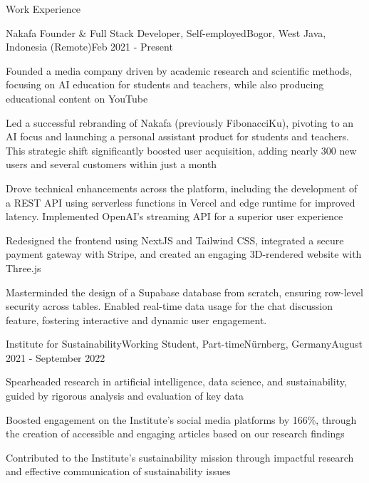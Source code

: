 \documentclass{article}
\newlength{\tabin}
\newlength{\secsep}
\newcommand{\lineunder}{\vspace*{-6pt} \\ \hspace*{-6pt} \hrulefill \\ \vspace*{-15pt}}
\newenvironment{tabbedsection}[1]{
  \begin{list}{}{
      \setlength{\itemsep}{0pt}
      \setlength{\labelsep}{0pt}
      \setlength{\labelwidth}{0pt}
      \setlength{\leftmargin}{\tabin}
      \setlength{\rightmargin}{\tabin}
      \setlength{\listparindent}{0pt}
      \setlength{\parsep}{0pt}
      \setlength{\parskip}{0pt}
      \setlength{\partopsep}{0pt}
      \setlength{\topsep}{#1}
    }
  \item[]
}{\end{list}}
\newenvironment{resume_section}[1]{
  \vspace{1.5\secsep}
  \textsc{\large#1}
  \lineunder
  \begin{tabbedsection}{\secsep}
}{\end{tabbedsection}}
\newenvironment{subitems}{
  \renewcommand{\labelitemi}{-}
  \begin{itemize}
      \setlength{\labelsep}{1em}
}{\end{itemize}}
\newenvironment{resume_employer}[4]{
  \vspace{\secsep}
  \textbf{#1} \\ 
  \indent {\small #2} \hfill {\footnotesize#3 (#4)}
  \begin{tabbedsection}{0pt}
  \begin{subitems}
}{\end{subitems}\end{tabbedsection}}
\begin{document}
\begin{resume_section}{Work Experience}
      \begin{resume_employer}{Nakafa \href{https://www.fibonacciku.com}{}}{Founder \& Full Stack Developer, Self-employed}{Bogor, West Java, Indonesia (Remote)}{Feb 2021 - Present}
        \item Founded a media company driven by academic research and scientific methods, focusing on AI education for students and teachers, while also producing educational content on YouTube
        \item Led a successful rebranding of Nakafa (previously FibonacciKu), pivoting to an AI focus and launching a personal assistant product for students and teachers. This strategic shift significantly boosted user acquisition, adding nearly 300 new users and several customers within just a month
        \item Drove technical enhancements across the platform, including the development of a REST API using serverless functions in Vercel and edge runtime for improved latency. Implemented OpenAI's streaming API for a superior user experience
        \item Redesigned the frontend using NextJS and Tailwind CSS, integrated a secure payment gateway with Stripe, and created an engaging 3D-rendered website with Three.js
        \item Masterminded the design of a Supabase database from scratch, ensuring row-level security across tables. Enabled real-time data usage for the chat discussion feature, fostering interactive and dynamic user engagement.
      \end{resume_employer}

      \begin{resume_employer}{Institute for Sustainability}{Working Student, Part-time}{Nürnberg, Germany}{August 2021 - September 2022}
        \item Spearheaded research in artificial intelligence, data science, and sustainability, guided by rigorous analysis and evaluation of key data
        \item Boosted engagement on the Institute's social media platforms by 166\%, through the creation of accessible and engaging articles based on our research findings
        \item Contributed to the Institute's sustainability mission through impactful research and effective communication of sustainability issues
      \end{resume_employer}
    \end{resume_section}
\end{document}
